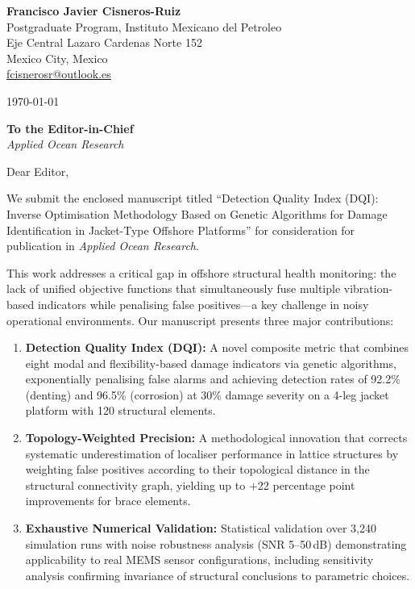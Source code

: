 \documentclass[11pt]{article}
\begin{document}
\noindent
\textbf{Francisco Javier Cisneros-Ruiz} \\
Postgraduate Program, Instituto Mexicano del Petroleo \\
Eje Central Lazaro Cardenas Norte 152 \\
Mexico City, Mexico \\
\href{mailto:fcisnerosr@outlook.es}{fcisnerosr@outlook.es} \\
\vspace{0.5cm}

\today

\vspace{0.5cm}

\noindent
\textbf{To the Editor-in-Chief} \\
\textit{Applied Ocean Research}

\vspace{0.5cm}

Dear Editor,

\vspace{0.3cm}

We submit the enclosed manuscript titled ``Detection Quality Index (DQI): Inverse Optimisation Methodology Based on Genetic Algorithms for Damage Identification in Jacket-Type Offshore Platforms'' for consideration for publication in \textit{Applied Ocean Research}.

This work addresses a critical gap in offshore structural health monitoring: the lack of unified objective functions that simultaneously fuse multiple vibration-based indicators while penalising false positives—a key challenge in noisy operational environments. Our manuscript presents three major contributions:

\begin{enumerate}
    \item \textbf{Detection Quality Index (DQI):} A novel composite metric that combines eight modal and flexibility-based damage indicators via genetic algorithms, exponentially penalising false alarms and achieving detection rates of 92.2\% (denting) and 96.5\% (corrosion) at 30\% damage severity on a 4-leg jacket platform with 120 structural elements.

    \item \textbf{Topology-Weighted Precision:} A methodological innovation that corrects systematic underestimation of localiser performance in lattice structures by weighting false positives according to their topological distance in the structural connectivity graph, yielding up to +22 percentage point improvements for brace elements.

    \item \textbf{Exhaustive Numerical Validation:} Statistical validation over 3{,}240 simulation runs with noise robustness analysis (SNR 5--50\,dB) demonstrating applicability to real MEMS sensor configurations, including sensitivity analysis confirming invariance of structural conclusions to parametric choices.
\end{enumerate}
\end{document}

